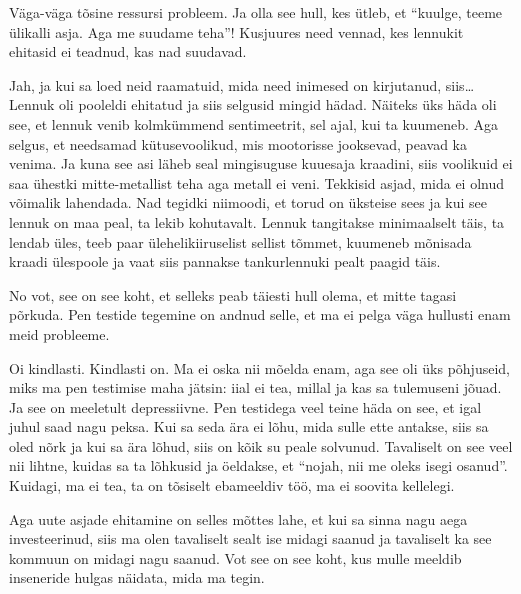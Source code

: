 Väga-väga tõsine  ressursi probleem. Ja olla see hull, kes ütleb, et \enquote{kuulge, teeme ülikalli asja. Aga me suudame teha}! Kusjuures need vennad, kes lennukit ehitasid ei teadnud, kas nad suudavad. 


Jah, ja kui sa loed neid raamatuid, mida need inimesed on kirjutanud, siis\ldots Lennuk oli pooleldi ehitatud ja siis selgusid mingid hädad. Näiteks üks häda oli see, et lennuk venib kolmkümmend sentimeetrit, sel ajal, kui ta kuumeneb. Aga selgus, et  needsamad kütusevoolikud, mis mootorisse jooksevad, peavad ka venima. Ja kuna see asi läheb seal mingisuguse kuuesaja kraadini, siis voolikuid ei saa ühestki mitte-metallist teha aga metall ei veni. Tekkisid asjad, mida ei olnud võimalik lahendada. Nad tegidki niimoodi, et torud on üksteise sees ja kui see lennuk on maa peal, ta lekib kohutavalt. Lennuk tangitakse minimaalselt täis,  ta lendab üles, teeb paar ülehelikiiruselist sellist tõmmet, kuumeneb mõnisada kraadi ülespoole ja vaat siis pannakse tankurlennuki pealt paagid täis. 


No vot, see on see koht, et selleks peab täiesti hull olema, et  mitte tagasi põrkuda. Pen testide tegemine on andnud selle, et ma ei pelga väga hullusti enam meid probleeme. 


Oi kindlasti. Kindlasti on. Ma ei oska nii mõelda enam, aga see oli üks põhjuseid, miks ma pen testimise maha jätsin: iial ei tea, millal ja kas sa  tulemuseni jõuad. Ja see on meeletult depressiivne. Pen testidega veel teine häda on see, et igal juhul saad nagu peksa. Kui sa seda ära ei lõhu, mida sulle ette antakse, siis sa oled nõrk ja kui sa  ära lõhud, siis on kõik su peale solvunud. Tavaliselt on see veel nii lihtne, kuidas sa ta  lõhkusid ja öeldakse, et \enquote{nojah, nii me oleks isegi osanud}. Kuidagi, ma ei tea, ta on tõsiselt ebameeldiv töö, ma ei soovita kellelegi. 

Aga uute asjade ehitamine on selles mõttes lahe, et kui sa sinna nagu aega investeerinud, siis ma olen tavaliselt sealt ise midagi saanud ja tavaliselt ka see kommuun on midagi nagu saanud. Vot see on see koht, kus mulle meeldib inseneride hulgas näidata, mida ma tegin. 


